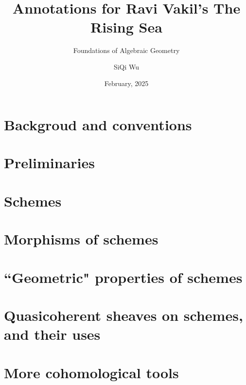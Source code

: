 \documentclass[11pt, mode=fancy, section, bibend=bibtex]{elegantbook}
\title{Annotations for Ravi Vakil's The Rising Sea}
\subtitle{Foundations of Algebraic Geometry}
\author{SiQi Wu}
\date{February, 2025}
\begin{document}
\maketitle

\frontmatter
\tableofcontents

\mainmatter

\part{Backgroud and conventions}


\part{Preliminaries}



\part{Schemes}





\part{Morphisms of schemes}






\part{``Geometric" properties of schemes}



\part{Quasicoherent sheaves on schemes, and their uses}



\part{More cohomological tools}

%

\nocite{*}
\printbibliography[heading=bibintoc, title=\ebibname]
\end{document}
